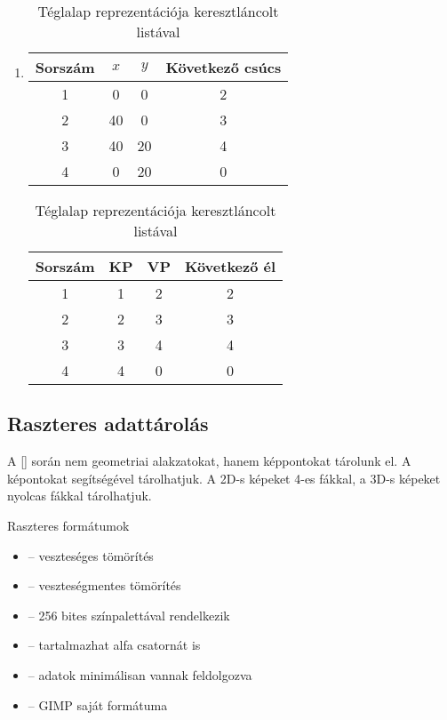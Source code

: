 \documentclass[../../main.tex]{subfiles}
\begin{document}
\begin{enumerate}
  \item {}
        \begin{table}[H]
          \centering
          \begin{tabular}{| c | c | c | c |}
            \hline
            Sorszám & $x$ & $y$ & Következő csúcs
            \\ \hline \hline
            1       & 0   & 0   & 2
            \\ \hline
            2       & 40  & 0   & 3
            \\ \hline
            3       & 40  & 20  & 4
            \\ \hline
            4       & 0   & 20  & 0
            \\ \hline
          \end{tabular}
          \hspace{1em}
          \begin{tabular}{| c | c | c | c |}
            \hline
            Sorszám & KP & VP & Következő él
            \\ \hline \hline
            1       & 1  & 2  & 2
            \\ \hline
            2       & 2  & 3  & 3
            \\ \hline
            3       & 3  & 4  & 4
            \\ \hline
            4       & 4  & 0  & 0
            \\ \hline
          \end{tabular}
          \caption{Téglalap reprezentációja keresztláncolt listával}
          \label{table:rec-crosslist}
        \end{table}
\end{enumerate}

\subsection{Raszteres adattárolás}

A [] során  nem geometriai alakzatokat, hanem
képpontokat tárolunk el. A képontokat  segítségével tárolhatjuk.
A 2D-s képeket 4-es fákkal, a 3D-s képeket nyolcas fákkal tárolhatjuk.

Raszteres formátumok
\begin{itemize}
  \item {} -- veszteséges tömörítés
  \item {} -- veszteségmentes tömörítés
  \item {} -- 256 bites színpalettával rendelkezik
  \item {} -- tartalmazhat alfa csatornát is
  \item {} -- adatok minimálisan vannak feldolgozva
  \item {} -- GIMP saját formátuma
\end{itemize}
\end{document}
